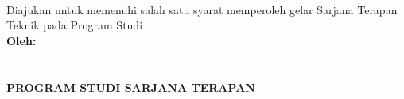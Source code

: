 \begin{titlepage}
    \begin{center}

        \begin{doublespace}
            \textbf{\MakeUppercase{\large{\tipe}}}\\[0.5cm]\textbf{\MakeUppercase{\normalsize{\judulid}}}\\\textbf{\large \MakeUppercase {\normalsize{\tempat}}} \\[3cm]
            
        \end{doublespace}
      
        Diajukan untuk memenuhi salah satu syarat memperoleh gelar Sarjana Terapan Teknik pada Program Studi {\prodi} {\departemen} {\fakultas} {\universitas}\\[3cm]
        

        \textbf{\normalsize {Oleh:}} \\
        \textbf{\normalsize \MakeUppercase{\underline{\penulis}}} \\
        \textbf{\normalsize \MakeUppercase{{\nim}}} \\[5cm]


        \textbf{\normalsize \MakeUppercase{Program Studi Sarjana Terapan\\ \prodi}}\\
        \textbf{\normalsize \MakeUppercase{\departemen}}\\
        \textbf{\normalsize \MakeUppercase{\fakultas}}\\
        \textbf{\normalsize \MakeUppercase{\universitas}}\\
        \textbf{\normalsize \the\year{}}\\
    \end{center}
\end{titlepage}